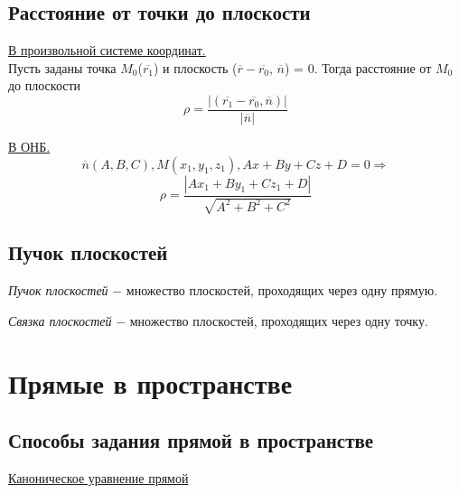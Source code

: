 \subsection{Расстояние от точки до плоскости}

\underline{В произвольной системе координат.}\\

Пусть заданы точка $M_0$($\overline{r_1}$) и плоскость ($\overline{r} - \overline{r_0}$, $\overline{n}$) = 0. Тогда расстояние от $M_0$ до плоскости
\[
\rho = \dfrac{|(\overline{r_1} - \overline{r_0}, \overline{n})|}{|\overline{n}|}
\]

\underline{В ОНБ.}\\

\[
\overline{n}(A, B, C), M(x_1, y_1, z_1), Ax + By + Cz + D = 0 \Longrightarrow
\]
\[
\rho = \dfrac{|Ax_1 + By_1 + Cz_1 + D|}{\sqrt{A^2 + B^2 + C^2}}
\]
\subsection{Пучок плоскостей}

\begin{definition}
    \textit{Пучок плоскостей} $-$ множество плоскостей, проходящих через одну прямую.
\end{definition}

\begin{definition}
    \textit{Связка плоскостей} $-$ множество плоскостей, проходящих через одну точку.
\end{definition}
\clearpage
\section{Прямые в пространстве}

\subsection{Способы задания прямой в пространстве}

\underline{Каноническое уравнение прямой}\\

